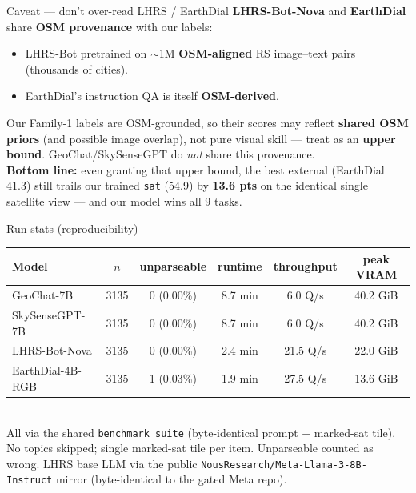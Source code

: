 \documentclass[aspectratio=169]{beamer}
\begin{document}
\begin{frame}{\large Caveat --- don't over-read LHRS / EarthDial}
\small
\textbf{LHRS-Bot-Nova} and \textbf{EarthDial} share \textbf{OSM provenance} with our labels:
\begin{itemize}
\item LHRS-Bot pretrained on $\sim$1M \textbf{OSM-aligned} RS image--text pairs (thousands of cities).
\item EarthDial's instruction QA is itself \textbf{OSM-derived}.
\end{itemize}
Our Family-1 labels are OSM-grounded, so their scores may reflect \textbf{shared OSM priors}
(and possible image overlap), not pure visual skill --- treat as an \textbf{upper bound}.
GeoChat/SkySenseGPT do \emph{not} share this provenance.\\[6pt]
\textbf{Bottom line:} even granting that upper bound, the best external (EarthDial 41.3)
still trails our trained \texttt{sat} (54.9) by \textbf{13.6 pts} on the identical single
satellite view --- and our model wins all 9 tasks.
\end{frame}

\begin{frame}{Run stats (reproducibility)}
\centering\footnotesize
\begin{tabular}{lccccc}
\toprule
Model & $n$ & unparseable & runtime & throughput & peak VRAM \\
\midrule
GeoChat-7B       & 3135 & 0 (0.00\%) & 8.7 min & 6.0 Q/s & 40.2 GiB \\
SkySenseGPT-7B   & 3135 & 0 (0.00\%) & 8.7 min & 6.0 Q/s & 40.2 GiB \\
LHRS-Bot-Nova    & 3135 & 0 (0.00\%) & 2.4 min & 21.5 Q/s & 22.0 GiB \\
EarthDial-4B-RGB & 3135 & 1 (0.03\%) & 1.9 min & 27.5 Q/s & 13.6 GiB \\
\bottomrule
\end{tabular}\\[8pt]
\footnotesize All via the shared \texttt{benchmark\_suite} (byte-identical prompt + marked-sat
tile). No topics skipped; single marked-sat tile per item. Unparseable counted as wrong.
LHRS base LLM via the public \texttt{NousResearch/Meta-Llama-3-8B-Instruct} mirror
(byte-identical to the gated Meta repo).
\end{frame}
\end{document}
